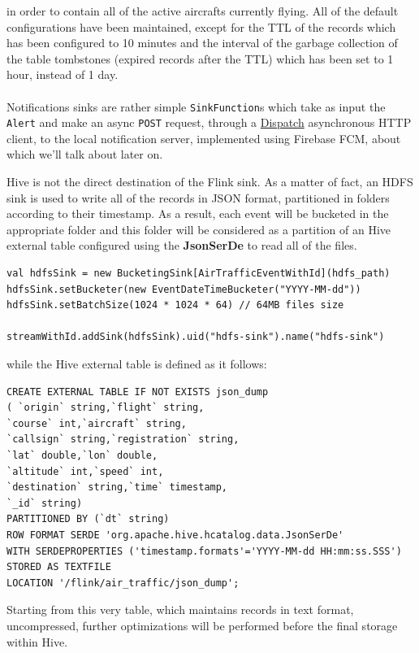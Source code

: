in order to contain all of the active aircrafts currently flying. All of the default configurations have been maintained, except for the TTL of the records which has been configured to 10 minutes and the interval of the garbage collection of the table tombstones (expired records after the TTL) which has been set to 1 hour, instead of 1 day.
\\ \\
Notifications sinks are rather simple \texttt{SinkFunction}s which take as input the \texttt{Alert} and make an async \texttt{POST} request, through a \href{https://dispatchhttp.org/Dispatch.html}{Dispatch} asynchronous HTTP client, to the local notification server, implemented using Firebase FCM, about which we'll talk about later on.

\pagebreak
Hive is not the direct destination of the Flink sink. As a matter of fact, an HDFS sink is used to write all of the records in JSON format, partitioned in folders according to their timestamp. As a result, each event will be bucketed in the appropriate folder and this folder will be considered as a partition of an Hive external table configured using the \textbf{JsonSerDe} to read all of the files.
\\
\begin{verbatim}
val hdfsSink = new BucketingSink[AirTrafficEventWithId](hdfs_path)
hdfsSink.setBucketer(new EventDateTimeBucketer("YYYY-MM-dd"))
hdfsSink.setBatchSize(1024 * 1024 * 64) // 64MB files size

streamWithId.addSink(hdfsSink).uid("hdfs-sink").name("hdfs-sink")
\end{verbatim}

while the Hive external table is defined as it follows:
\\
\begin{verbatim}
CREATE EXTERNAL TABLE IF NOT EXISTS json_dump
( `origin` string,`flight` string,
`course` int,`aircraft` string,
`callsign` string,`registration` string,
`lat` double,`lon` double,
`altitude` int,`speed` int,
`destination` string,`time` timestamp,
`_id` string)
PARTITIONED BY (`dt` string)
ROW FORMAT SERDE 'org.apache.hive.hcatalog.data.JsonSerDe'
WITH SERDEPROPERTIES ('timestamp.formats'='YYYY-MM-dd HH:mm:ss.SSS')
STORED AS TEXTFILE
LOCATION '/flink/air_traffic/json_dump';
\end{verbatim}

Starting from this very table, which maintains records in text format, uncompressed, further optimizations will be performed before the final storage within Hive.

